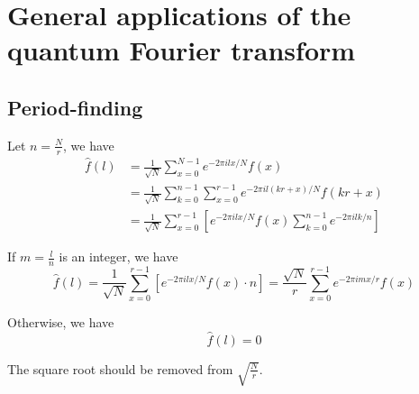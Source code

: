 \documentclass[../main.tex]{subfiles}
\begin{document}
\setcounter{chapter}{5}
\setcounter{section}{3}
\setcounter{exercise}{19}
\section{General applications of the quantum Fourier transform}
\subsection{Period-finding}

\begin{exercise}
\end{exercise}
Let $n=\frac{N}{r}$, we have
\begin{align*}
    \hat{f}(l)
    &= \frac{1}{\sqrt{N}}\sum_{x=0}^{N-1}e^{-2\pi i l x/N}f(x) \\
    &= \frac{1}{\sqrt{N}}\sum_{k=0}^{n-1}\sum_{x=0}^{r-1}e^{-2\pi i l (k r+x)/N}f(k r + x) \\
    &= \frac{1}{\sqrt{N}}\sum_{x=0}^{r-1}\left[e^{-2\pi i l x/N}f(x)\sum_{k=0}^{n-1}e^{-2\pi i l k/n}\right]
\end{align*}

If $m=\frac{l}{n}$ is an integer, we have
\[
    \hat{f}(l)
    = \frac{1}{\sqrt{N}}\sum_{x=0}^{r-1}\left[e^{-2\pi i l x/N}f(x) \cdot n\right]
    = \frac{\sqrt{N}}{r}\sum_{x=0}^{r-1}e^{-2\pi i m x/r}f(x)
\]

Otherwise, we have 
\[
    \hat{f}(l) = 0
\]
\begin{remark}
The square root should be removed from $\sqrt{\frac{N}{r}}$.
\end{remark}
\end{document}
